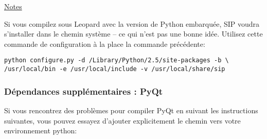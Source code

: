 \underline{Notes}

Si vous compilez sous Leopard avec la version de Python embarquée, SIP voudra s'installer dans le chemin système -- ce qui n'est pas une bonne idée. Utilisez cette commande de configuration à la place la commande précédente:

\begin{verbatim}
python configure.py -d /Library/Python/2.5/site-packages -b \
/usr/local/bin -e /usr/local/include -v /usr/local/share/sip
\end{verbatim}

% 
% 
% 
% 
% 
% 
% 
% 
% 

\subsubsection{Dépendances supplémentaires : PyQt}
Si vous rencontrez des problèmes pour compiler PyQt en suivant les instructions suivantes, vous pouvez essayez d'ajouter explicitement le chemin vers votre environnement python:

